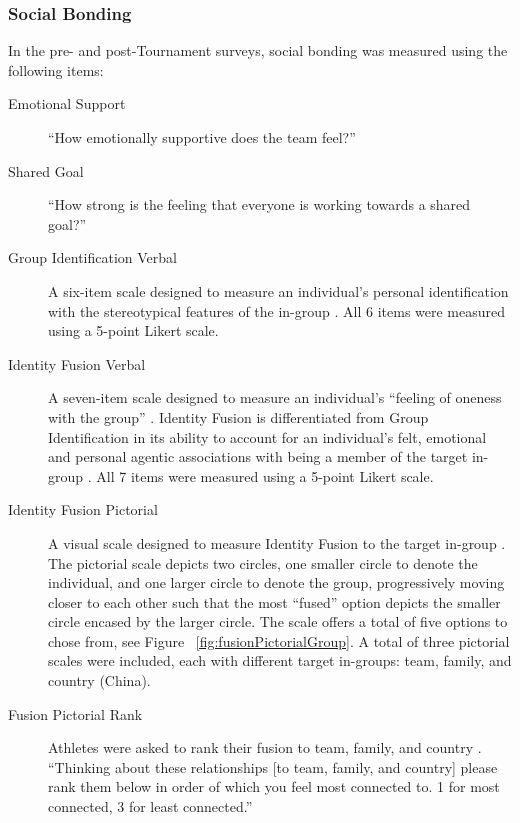     \subsubsection{Social Bonding}
In the pre- and post-Tournament surveys, social bonding was measured using the following items:
\begin{description}
  \item [Emotional Support] ``How emotionally supportive does the team feel?''
  \item [Shared Goal] ``How strong is the feeling that everyone is working towards a shared goal?''
  \item [Group Identification Verbal] A six-item scale designed to measure an individual's personal identification with the stereotypical features of the in-group  \citep{Mael1992}.  All 6 items were measured using a 5-point Likert scale.


\item [Identity Fusion Verbal] A seven-item scale designed to measure an individual's ``feeling of oneness with the group'' \citep{Swann2009}.  Identity Fusion is differentiated from Group Identification in its ability to account for an individual's felt, emotional and personal agentic associations with being a member of the target in-group \citep{Swann2012a}.  All 7 items were measured using a 5-point Likert scale.


\item [Identity Fusion Pictorial] A visual scale designed to measure Identity Fusion to the target in-group \citep{Swann2009}. The pictorial scale depicts two circles, one smaller circle to denote the individual, and one larger circle to denote the group, progressively moving closer to each other such that the most ``fused'' option depicts the smaller circle encased by the larger circle. The scale offers a total of five options to chose from, see Figure ~\ref{fig:fusionPictorialGroup}.  A total of three pictorial scales were included, each with different target in-groups: team, family, and country (China).
\item [Fusion Pictorial Rank] Athletes were asked to rank their fusion to team, family, and country \citep{Whitehouse2014}.  ``Thinking about these relationships [to team, family, and country] please rank them below in order of which you feel most connected to. 1 for most connected, 3 for least connected.''
\end{description}




